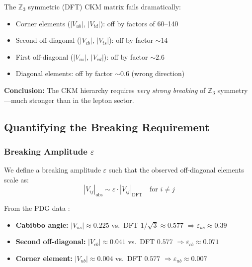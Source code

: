\begin{tcolorbox}[colback=red!5, colframe=red!50!black,
    title=\textbf{Verdict: DFT Baseline STRONGLY FALSIFIED}]
The $\mathbb{Z}_3$ symmetric (DFT) CKM matrix fails dramatically:
\begin{itemize}[nosep]
    \item Corner elements ($|V_{ub}|$, $|V_{td}|$): off by factors of 60--140
    \item Second off-diagonal ($|V_{cb}|$, $|V_{ts}|$): off by factor $\sim 14$
    \item First off-diagonal ($|V_{us}|$, $|V_{cd}|$): off by factor $\sim 2.6$
    \item Diagonal elements: off by factor $\sim 0.6$ (wrong direction)
\end{itemize}

\textbf{Conclusion:} The CKM hierarchy requires \emph{very strong breaking}
of $\mathbb{Z}_3$ symmetry---much stronger than in the lepton sector.
\end{tcolorbox}

\subsection{Quantifying the Breaking Requirement}
\label{sec:ch7_breaking}

\subsubsection{Breaking Amplitude $\varepsilon$}

We define a breaking amplitude $\varepsilon$ such that the observed off-diagonal
elements scale as:
\begin{equation}
    |V_{ij}|_{\text{obs}} \sim \varepsilon \cdot |V_{ij}|_{\text{DFT}}
    \quad\text{for } i \neq j
    \label{eq:ch7_epsilon_def}
\end{equation}

From the PDG data \tagBL{}:
\begin{itemize}[nosep]
    \item \textbf{Cabibbo angle:} $|V_{us}| \approx 0.225$ vs.\ DFT $1/\sqrt{3} \approx 0.577$
          $\Rightarrow \varepsilon_{us} \approx 0.39$
    \item \textbf{Second off-diagonal:} $|V_{cb}| \approx 0.041$ vs.\ DFT $0.577$
          $\Rightarrow \varepsilon_{cb} \approx 0.071$
    \item \textbf{Corner element:} $|V_{ub}| \approx 0.004$ vs.\ DFT $0.577$
          $\Rightarrow \varepsilon_{ub} \approx 0.007$
\end{itemize}

